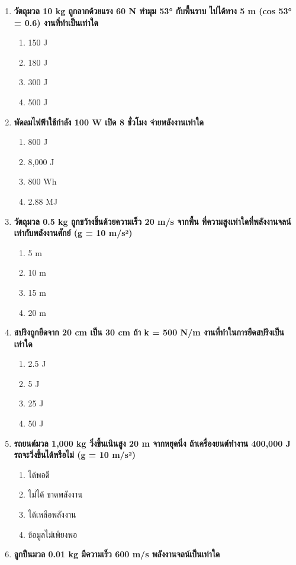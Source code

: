 \documentclass[12pt]{article}
\begin{document}
\begin{enumerate}
\begin{enumerate}[label=\alph*)]
\end{enumerate}
\item \textbf{วัตถุมวล 10 kg ถูกลากด้วยแรง 60 N ทำมุม 53° กับพื้นราบ ไปได้ทาง 5 m (cos 53° = 0.6) งานที่ทำเป็นเท่าใด}
\begin{enumerate}[label=\alph*)]
\item 150 J
\item 180 J
\item 300 J
\item 500 J
\end{enumerate}
\item \textbf{พัดลมไฟฟ้าใช้กำลัง 100 W เปิด 8 ชั่วโมง จ่ายพลังงานเท่าใด}
\begin{enumerate}[label=\alph*)]
\item 800 J
\item 8,000 J
\item 800 Wh
\item 2.88 MJ
\end{enumerate}
\item \textbf{วัตถุมวล 0.5 kg ถูกขว้างขึ้นด้วยความเร็ว 20 m/s จากพื้น ที่ความสูงเท่าใดที่พลังงานจลน์เท่ากับพลังงานศักย์ (g = 10 m/s²)}
\begin{enumerate}[label=\alph*)]
\item 5 m
\item 10 m
\item 15 m
\item 20 m
\end{enumerate}
\item \textbf{สปริงถูกยืดจาก 20 cm เป็น 30 cm ถ้า k = 500 N/m งานที่ทำในการยืดสปริงเป็นเท่าใด}
\begin{enumerate}[label=\alph*)]
\item 2.5 J
\item 5 J
\item 25 J
\item 50 J
\end{enumerate}
\item \textbf{รถยนต์มวล 1,000 kg วิ่งขึ้นเนินสูง 20 m จากหยุดนิ่ง ถ้าเครื่องยนต์ทำงาน 400,000 J รถจะวิ่งขึ้นได้หรือไม่ (g = 10 m/s²)}
\begin{enumerate}[label=\alph*)]
\item ได้พอดี
\item ไม่ได้ ขาดพลังงาน
\item ได้เหลือพลังงาน
\item ข้อมูลไม่เพียงพอ
\end{enumerate}
\item \textbf{ลูกปืนมวล 0.01 kg มีความเร็ว 600 m/s พลังงานจลน์เป็นเท่าใด}

\end{enumerate}
\end{document}
